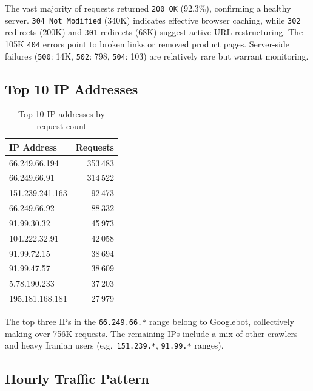 \documentclass[12pt,a4paper]{article}
\begin{document}
The vast majority of requests returned \texttt{200~OK} (92.3\%), confirming a healthy server. \texttt{304~Not Modified} (340K) indicates effective browser caching, while \texttt{302} redirects (200K) and \texttt{301} redirects (68K) suggest active URL restructuring. The 105K \texttt{404} errors point to broken links or removed product pages. Server-side failures (\texttt{500}: 14K, \texttt{502}: 798, \texttt{504}: 103) are relatively rare but warrant monitoring.

\subsection{Top 10 IP Addresses}

\begin{table}[H]
\centering
\caption{Top 10 IP addresses by request count}
\begin{tabular}{@{}lr@{}}
\hline
\textbf{IP Address} & \textbf{Requests} \\ \hline
66.249.66.194   & 353\,483 \\
66.249.66.91    & 314\,522 \\
151.239.241.163 & 92\,473 \\
66.249.66.92    & 88\,332 \\
91.99.30.32     & 45\,973 \\
104.222.32.91   & 42\,058 \\
91.99.72.15     & 38\,694 \\
91.99.47.57     & 38\,609 \\
5.78.190.233    & 37\,203 \\
195.181.168.181 & 27\,979 \\
\hline
\end{tabular}
\end{table}

The top three IPs in the \texttt{66.249.66.*} range belong to Googlebot, collectively making over 756K requests. The remaining IPs include a mix of other crawlers and heavy Iranian users (e.g.\ \texttt{151.239.*}, \texttt{91.99.*} ranges).

\subsection{Hourly Traffic Pattern}
\end{document}
